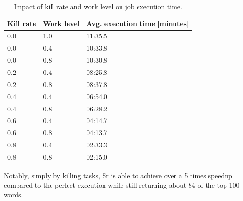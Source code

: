 \documentclass[12pt]{article}
\begin{document}
\begin{table}
\begin{tabularx}{\linewidth}{|X|X|X|}
\hline
Kill rate & Work level & Avg. execution time [minutes] \\ \hline
0.0 & 1.0 & 11:35.5 \\ \hline
0.0 & 0.4 & 10:33.8 \\ \hline
0.0 & 0.8 & 10:30.8 \\ \hline
0.2 & 0.4 & 08:25.8 \\ \hline
0.2 & 0.8 & 08:37.8 \\ \hline
0.4 & 0.4 & 06:54.0 \\ \hline
0.4 & 0.8 & 06:28.2 \\ \hline
0.6 & 0.4 & 04:14.7 \\ \hline
0.6 & 0.8 & 04:13.7 \\ \hline
0.8 & 0.4 & 02:33.3 \\ \hline
0.8 & 0.8 & 02:15.0 \\ \hline
\end{tabularx}
\caption{Impact of kill rate and work level on job execution time.}
\label{table:runtime}
\end{table}

Notably, simply by killing tasks, Sr is able to achieve over a 5 times speedup compared to the perfect execution while still returning about 84 of the top-100 words.
\end{document}

